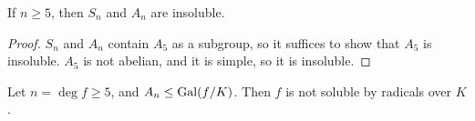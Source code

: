 \begin{proposition}
	If \( n \geq 5 \), then \( S_n \) and \( A_n \) are insoluble.
\end{proposition}
\begin{proof}
	\( S_n \) and \( A_n \) contain \( A_5 \) as a subgroup, so it suffices to show that \( A_5 \) is insoluble.
	\( A_5 \) is not abelian, and it is simple, so it is insoluble.
\end{proof}
\begin{corollary}
	Let \( n = \deg f \geq 5 \), and \( A_n \leq \operatorname{Gal}(f/K) \).
	Then \( f \) is not soluble by radicals over \( K \).
\end{corollary}

